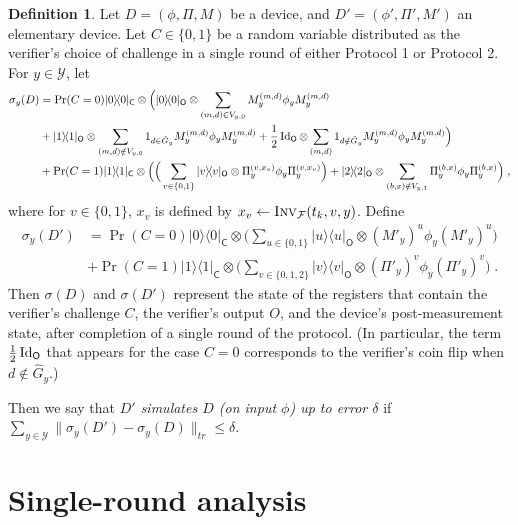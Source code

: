 \documentclass[11pt]{article}
\theoremstyle{remark}
\theoremstyle{definition}
\newtheorem{definition}[theorem]{Definition}
\newcommand{\ket}[1]{|#1\rangle}
\newcommand{\bra}[1]{\langle#1|}
\newcommand{\proj}[1]{\ket{#1}\!\bra{#1}}
\newcommand{\Id}{\ensuremath{\mathop{\rm Id}\nolimits}}
\newcommand{\reg}[1]{{\textsf{#1}}}
\newcommand{\mF}{\ensuremath{\mathcal{F}}}
\newcommand{\mY}{\ensuremath{\mathcal{Y}}}
\newcommand{\Inv}{\ensuremath{\textsc{Inv}}}
\newcommand{\dset}{G}
\begin{document}
\begin{definition}\label{def:device-dist}
Let $D = (\phi,\Pi,M)$ be a device, and $D'=(\phi',\Pi',M')$ an elementary device. 
Let $C\in\{0,1\}$ be a random variable distributed as the verifier's choice of challenge in a single round of either Protocol 1 or Protocol 2. For $y\in \mY$, let
\begin{align*}
\sigma_y(D) &=   \Pr(C=0) \proj{0}_\reg{C} \otimes\Big(  \proj{0}_\reg{O} \otimes  \sum_{(m,d) \in V_{y,0}}  M_y^{(m,d)} \phi_y M_y^{(m,d)}\\
& +   \proj{1}_\reg{O} \otimes  \sum_{(m,d) \notin V_{y,0}} 1_{d\in \hat{\dset}_y}  M_y^{(m,d)} \phi_y M_y^{(m,d)} + \frac{1}{2}\Id_{\reg{O}}\otimes  \sum_{(m,d)} 1_{d\notin \hat{\dset}_y}  M_y^{(m,d)} \phi_y M_y^{(m,d)} \Big)\\
&+\Pr(C=1)\proj{1}_\reg{C} \otimes \Big( \Big(\sum_{v\in\{0,1\}} \proj{v}_\reg{O} \otimes  \Pi_y^{(v,x_v)} \phi_y \Pi_y^{(v,x_v)} \Big)+ \proj{2}_\reg{O}\otimes \sum_{(b,x)\notin V_{y,1}}  \Pi_y^{(b,x)} \phi_y \Pi_y^{(b,x)}\Big)\;,
\end{align*}
where for $v\in\{0,1\}$, $x_v$ is defined by $x_v\leftarrow \Inv_\mF(t_k,v,y)$. Define 
\begin{align*}
\sigma_y(D') &= \Pr(C=0) \proj{0}_\reg{C} \otimes\big( \sum_{u\in \{0,1\}} \proj{u}_\reg{O}\otimes (M'_y)^{u} \phi_y (M'_y)^{u}\Big)\\
&+\Pr(C=1)\proj{1}_\reg{C} \otimes \Big(\sum_{v\in\{0,1,2\}} \proj{v}_\reg{O} \otimes  (\Pi'_y)^{v} \phi_y (\Pi'_y)^{v} \Big)\;.
\end{align*}
Then $\sigma(D)$ and $\sigma(D')$ represent the state of the registers that contain the verifier's challenge $C$, the verifier's output $O$, and the device's post-measurement state, after completion of a single round of the protocol. (In particular, the term $\frac{1}{2}\Id_{\reg{O}}$ that appears for the case $C=0$ corresponds to the verifier's coin flip when $d\notin \hat{\dset}_y$.)

Then we say that \emph{$D'$ simulates $D$ (on input $\phi$) up to error $\delta$} if $\sum_{y\in\mY}\|\sigma_y(D')-\sigma_y(D)\|_{tr} \leq \delta$. 
\end{definition}




\section{Single-round analysis}
\label{sec:soundness}
\end{document}
